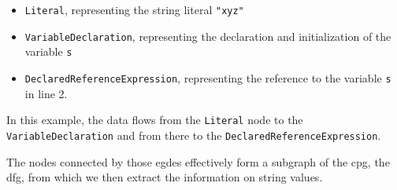 \begin{itemize}
	\item \lstinline|Literal|, representing the string literal \lstinline{"xyz"}
	\item \lstinline|VariableDeclaration|, representing the declaration and initialization of the variable \lstinline|s|
	\item \lstinline|DeclaredReferenceExpression|, representing the reference to the variable \lstinline|s| in line 2.
\end{itemize}

In this example, the data flows from the \lstinline|Literal| node to the \lstinline|VariableDeclaration| and from there to the \lstinline|DeclaredReferenceExpression|.

The nodes connected by those egdes effectively form a subgraph of the \ac{cpg}, the \ac{dfg}, from which we then extract the information on string values.



